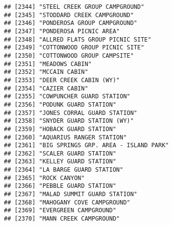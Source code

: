 \documentclass[
]{article}
\begin{document}
\begin{verbatim}
## [2344] "STEEL CREEK GROUP CAMPGROUND"                                                        
## [2345] "STODDARD CREEK CAMPGROUND"                                                           
## [2346] "PONDEROSA GROUP CAMPGROUND"                                                          
## [2347] "PONDEROSA PICNIC AREA"                                                               
## [2348] "ALLRED FLATS GROUP PICNIC SITE"                                                      
## [2349] "COTTONWOOD GROUP PICNIC SITE"                                                        
## [2350] "COTTONWOOD GROUP CAMPSITE"                                                           
## [2351] "MEADOWS CABIN"                                                                       
## [2352] "MCCAIN CABIN"                                                                        
## [2353] "DEER CREEK CABIN (WY)"                                                               
## [2354] "CAZIER CABIN"                                                                        
## [2355] "COWPUNCHER GUARD STATION"                                                            
## [2356] "PODUNK GUARD STATION"                                                                
## [2357] "JONES CORRAL GUARD STATION"                                                          
## [2358] "SNYDER GUARD STATION (WY)"                                                           
## [2359] "HOBACK GUARD STATION"                                                                
## [2360] "AQUARIUS RANGER STATION"                                                             
## [2361] "BIG SPRINGS GRP. AREA - ISLAND PARK"                                                 
## [2362] "SCALER GUARD STATION"                                                                
## [2363] "KELLEY GUARD STATION"                                                                
## [2364] "LA BARGE GUARD STATION"                                                              
## [2365] "ROCK CANYON"                                                                         
## [2366] "PEBBLE GUARD STATION"                                                                
## [2367] "MALAD SUMMIT GUARD STATION"                                                          
## [2368] "MAHOGANY COVE CAMPGROUND"                                                            
## [2369] "EVERGREEN CAMPGROUND"                                                                
## [2370] "MANN CREEK CAMPGROUND"                                                               

\end{verbatim}
\end{document}
